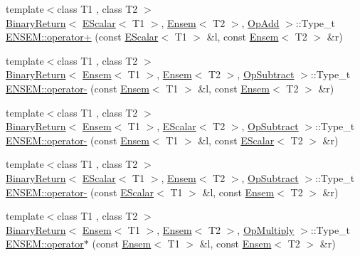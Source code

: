 \begin{DoxyCompactItemize}
\item 
{\footnotesize template$<$class T1 , class T2 $>$ }\\\mbox{\hyperlink{structENSEM_1_1BinaryReturn}{Binary\+Return}}$<$ \mbox{\hyperlink{classENSEM_1_1EScalar}{E\+Scalar}}$<$ T1 $>$, \mbox{\hyperlink{classENSEM_1_1Ensem}{Ensem}}$<$ T2 $>$, \mbox{\hyperlink{structENSEM_1_1OpAdd}{Op\+Add}} $>$\+::Type\+\_\+t \mbox{\hyperlink{group__eensem_ga28163898a2dffc17215669f8a85d65b4}{E\+N\+S\+E\+M\+::operator+}} (const \mbox{\hyperlink{classENSEM_1_1EScalar}{E\+Scalar}}$<$ T1 $>$ \&l, const \mbox{\hyperlink{classENSEM_1_1Ensem}{Ensem}}$<$ T2 $>$ \&r)
\item 
{\footnotesize template$<$class T1 , class T2 $>$ }\\\mbox{\hyperlink{structENSEM_1_1BinaryReturn}{Binary\+Return}}$<$ \mbox{\hyperlink{classENSEM_1_1Ensem}{Ensem}}$<$ T1 $>$, \mbox{\hyperlink{classENSEM_1_1Ensem}{Ensem}}$<$ T2 $>$, \mbox{\hyperlink{structENSEM_1_1OpSubtract}{Op\+Subtract}} $>$\+::Type\+\_\+t \mbox{\hyperlink{group__eensem_gaa7400c6ebea61c6e2869c81ab28d68b0}{E\+N\+S\+E\+M\+::operator-\/}} (const \mbox{\hyperlink{classENSEM_1_1Ensem}{Ensem}}$<$ T1 $>$ \&l, const \mbox{\hyperlink{classENSEM_1_1Ensem}{Ensem}}$<$ T2 $>$ \&r)
\item 
{\footnotesize template$<$class T1 , class T2 $>$ }\\\mbox{\hyperlink{structENSEM_1_1BinaryReturn}{Binary\+Return}}$<$ \mbox{\hyperlink{classENSEM_1_1Ensem}{Ensem}}$<$ T1 $>$, \mbox{\hyperlink{classENSEM_1_1EScalar}{E\+Scalar}}$<$ T2 $>$, \mbox{\hyperlink{structENSEM_1_1OpSubtract}{Op\+Subtract}} $>$\+::Type\+\_\+t \mbox{\hyperlink{group__eensem_ga2ca6914217df099912f3f38239141a55}{E\+N\+S\+E\+M\+::operator-\/}} (const \mbox{\hyperlink{classENSEM_1_1Ensem}{Ensem}}$<$ T1 $>$ \&l, const \mbox{\hyperlink{classENSEM_1_1EScalar}{E\+Scalar}}$<$ T2 $>$ \&r)
\item 
{\footnotesize template$<$class T1 , class T2 $>$ }\\\mbox{\hyperlink{structENSEM_1_1BinaryReturn}{Binary\+Return}}$<$ \mbox{\hyperlink{classENSEM_1_1EScalar}{E\+Scalar}}$<$ T1 $>$, \mbox{\hyperlink{classENSEM_1_1Ensem}{Ensem}}$<$ T2 $>$, \mbox{\hyperlink{structENSEM_1_1OpSubtract}{Op\+Subtract}} $>$\+::Type\+\_\+t \mbox{\hyperlink{group__eensem_ga800941462d54db3919bdb1fe8cd1c1b6}{E\+N\+S\+E\+M\+::operator-\/}} (const \mbox{\hyperlink{classENSEM_1_1EScalar}{E\+Scalar}}$<$ T1 $>$ \&l, const \mbox{\hyperlink{classENSEM_1_1Ensem}{Ensem}}$<$ T2 $>$ \&r)
\item 
{\footnotesize template$<$class T1 , class T2 $>$ }\\\mbox{\hyperlink{structENSEM_1_1BinaryReturn}{Binary\+Return}}$<$ \mbox{\hyperlink{classENSEM_1_1Ensem}{Ensem}}$<$ T1 $>$, \mbox{\hyperlink{classENSEM_1_1Ensem}{Ensem}}$<$ T2 $>$, \mbox{\hyperlink{structENSEM_1_1OpMultiply}{Op\+Multiply}} $>$\+::Type\+\_\+t \mbox{\hyperlink{group__eensem_gacf3333408054c89c251c9c44d25fa321}{E\+N\+S\+E\+M\+::operator$\ast$}} (const \mbox{\hyperlink{classENSEM_1_1Ensem}{Ensem}}$<$ T1 $>$ \&l, const \mbox{\hyperlink{classENSEM_1_1Ensem}{Ensem}}$<$ T2 $>$ \&r)

\end{DoxyCompactItemize}
